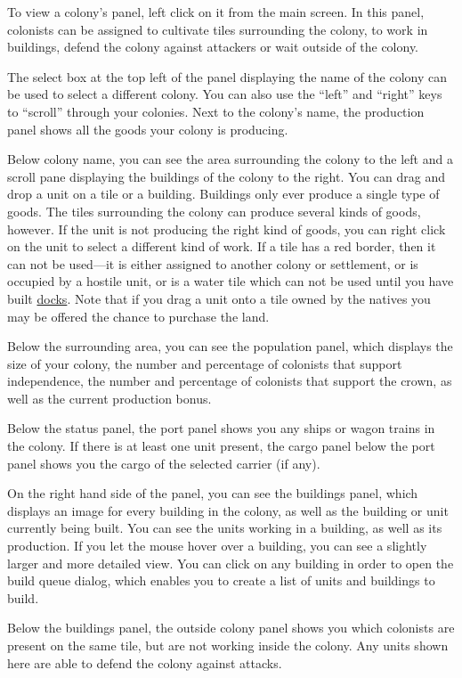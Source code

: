 \documentclass[12pt]{book}
\begin{document}
To view a colony's panel, left click on it from the main screen. In
this panel, colonists can be assigned to cultivate tiles surrounding
the colony, to work in buildings, defend the colony against attackers
or wait outside of the colony.

The select box at the top left of the panel displaying the name of the
colony can be used to select a different colony. You can also use the
``left'' and ``right'' keys to ``scroll'' through your colonies. Next
to the colony's name, the production panel shows all the goods your
colony is producing.

Below colony name, you can see the area surrounding the colony to the
left and a scroll pane displaying the buildings of the colony to the
right. You can drag and drop a unit on a tile or a building. Buildings
only ever produce a single type of goods. The tiles surrounding the
colony can produce several kinds of goods, however. If the unit is not
producing the right kind of goods, you can right click on the unit to
select a different kind of work. If a tile has a red border, then it
can not be used---it is either assigned to another colony or
settlement, or is occupied by a hostile unit, or is a water tile which
can not be used until you have built \hyperlink{Dock}{docks}.  Note
that if you drag a unit onto a tile owned by the natives you may be
offered the chance to purchase the land.

Below the surrounding area, you can see the population panel, which
displays the size of your colony, the number and percentage of
colonists that support independence, the number and percentage of
colonists that support the crown, as well as the current production
bonus.

Below the status panel, the port panel shows you any ships or wagon
trains in the colony. If there is at least one unit present, the cargo
panel below the port panel shows you the cargo of the selected carrier
(if any).

On the right hand side of the panel, you can see the buildings panel,
which displays an image for every building in the colony, as well as
the building or unit currently being built. You can see the units
working in a building, as well as its production. If you let the mouse
hover over a building, you can see a slightly larger and more detailed
view. You can click on any building in order to open the build queue
dialog, which enables you to create a list of units and buildings to
build.

Below the buildings panel, the outside colony panel shows you which
colonists are present on the same tile, but are not working inside the
colony. Any units shown here are able to defend the colony against
attacks.
\end{document}
